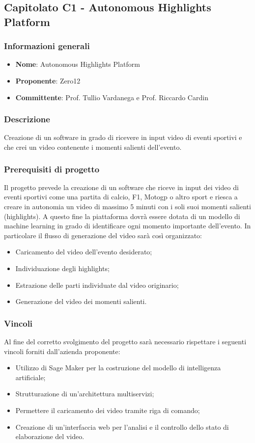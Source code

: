 \subsection{Capitolato C1 - Autonomous Highlights Platform}
\subsubsection{Informazioni generali}
\begin{itemize}
	\item \textbf{Nome}: Autonomous Highlights Platform
	\item \textbf{Proponente}: Zero12
	\item \textbf{Committente}: Prof. Tullio Vardanega e Prof. Riccardo Cardin
\end{itemize}
\subsubsection{Descrizione}
Creazione di un software in grado di ricevere in input video di eventi sportivi e che crei un video contenente i momenti salienti dell'evento.
\subsubsection{Prerequisiti di progetto}
Il progetto prevede la creazione di un software che riceve in input dei video di eventi sportivi come una partita di calcio, F1, Motogp o altro sport e riesca a creare in autonomia un video di massimo 5 minuti con i soli suoi momenti salienti (highlights). A questo fine la piattaforma dovrà essere dotata di un modello di machine learning in grado di identificare ogni momento importante dell’evento.
In particolare il flusso di generazione del video sarà così organizzato:
\begin{itemize}
	\item Caricamento del video dell'evento desiderato;
	\item Individuazione degli highlights;
	\item Estrazione delle parti individuate dal video originario;
	\item Generazione del video dei momenti salienti.
\end{itemize}
\subsubsection{Vincoli}
Al fine del corretto svolgimento del progetto sarà necessario rispettare i seguenti vincoli forniti dall'azienda proponente:
\begin{itemize}
	\item Utilizzo di Sage Maker per la costruzione del modello di intelligenza artificiale;
	\item Strutturazione di un'architettura multiservizi;
	\item Permettere il caricamento dei video tramite riga di comando;
	\item Creazione di un'interfaccia web per l'analisi e il controllo dello stato di elaborazione del video.
\end{itemize}
